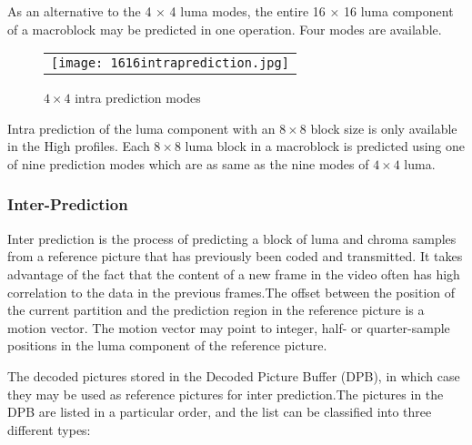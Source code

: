 \documentclass[../main.tex]{subfiles}
\begin{document}
As an alternative to the 4 × 4 luma modes, the entire 16 × 16 luma component
of a macroblock may be predicted in one operation. Four modes are available.

\begin{figure} [ht]
   \begin{center}
   \begin{tabular}{c} %
   \texttt{[image: 1616intraprediction.jpg]}
   \end{tabular}
   \end{center}
   \caption[example] 
   { \label{fig:example} 
$4 \times 4$ intra prediction modes }
   \end{figure}     %
   
Intra prediction of the luma component with an $8 \times 8$ block size is only available in the High
profiles. Each $8 \times 8$ luma block in a macroblock is predicted using one of nine
prediction modes which are as same as the nine modes of $4 \times 4$ luma.
   
\subsubsection{ Inter-Prediction }

Inter prediction is the process of predicting
a block of luma and chroma samples from a reference picture that has
previously been coded and transmitted. It
takes advantage of the fact that the content of a new frame in
the video often has high correlation to the data in the
previous frames.The offset between the position of the current partition and the prediction
region in the reference picture is a motion vector. The motion vector may point to integer,
half- or quarter-sample positions in the luma component of the reference picture. 

The decoded pictures stored in the Decoded
Picture Buffer (DPB), in which case they may be used as
reference pictures for inter prediction.The pictures in the DPB are listed in a particular order, and
the list can be classified into three different types:
\end{document}
